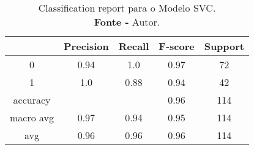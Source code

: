 % 
\begin{table}[H]
    \centering
    \begin{tabular}{@{}ccccc@{}}
    \toprule
     & \textbf{Precision} & \textbf{Recall} &\textbf{F-score} & \textbf{Support} \\ \midrule 
    0 & 0.94 & 1.0 & 0.97 & 72 \\ 
    1 & 1.0 & 0.88 & 0.94 & 42 \\ 
    accuracy &  &  & 0.96 & 114 \\ 
    macro avg & 0.97 & 0.94 & 0.95 & 114 \\ 
    avg & 0.96 & 0.96 & 0.96 & 114 \\ \bottomrule 
    \end{tabular}
    \caption{Classification report para o Modelo SVC. \\ \textbf{Fonte -} Autor.}
    \label{tab: classification-report-Modelo SVC}
\end{table}